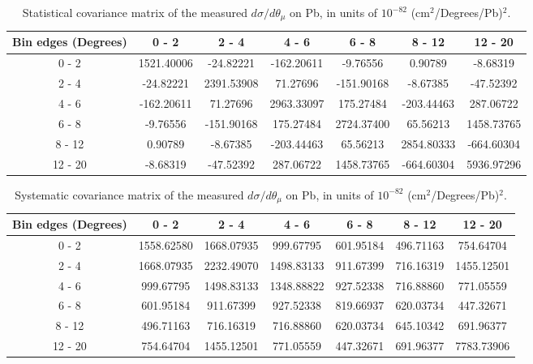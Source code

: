 \documentclass[aps,prl,twocolumn,superscriptaddress,nofootinbib]{revtex4-1}
\begin{document}
\begin{table}[h!]
  \centering
  \caption{Statistical covariance matrix of the measured $d\sigma/d\theta_{\mu}$ on Pb, in units of $10^{-82}$ (cm$^{2}$/Degrees/Pb)$^{2}$.}
    \begin{tabular}{c||cccccc}
      Bin edges (Degrees) & 0 - 2 & 2 - 4 & 4 - 6 & 6 - 8 & 8 - 12 & 12 - 20 \\
\hline \hline
        0 - 2 & 1521.40006 & -24.82221 & -162.20611 & -9.76556 &  0.90789 & -8.68319 \\
        2 - 4 & -24.82221 & 2391.53908 & 71.27696 & -151.90168 & -8.67385 & -47.52392 \\
        4 - 6 & -162.20611 & 71.27696 & 2963.33097 & 175.27484 & -203.44463 & 287.06722 \\
        6 - 8 & -9.76556 & -151.90168 & 175.27484 & 2724.37400 & 65.56213 & 1458.73765 \\
       8 - 12 &  0.90789 & -8.67385 & -203.44463 & 65.56213 & 2854.80333 & -664.60304 \\
      12 - 20 & -8.68319 & -47.52392 & 287.06722 & 1458.73765 & -664.60304 & 5936.97296 \\
    \end{tabular}
  \label{tablecov:Pb_Statistical_ThetaMu}
\end{table}

\begin{table}[h!]
  \centering
  \caption{Systematic covariance matrix of the measured $d\sigma/d\theta_{\mu}$ on Pb, in units of $10^{-82}$ (cm$^{2}$/Degrees/Pb)$^{2}$.}
    \begin{tabular}{c||cccccc}
      Bin edges (Degrees) & 0 - 2 & 2 - 4 & 4 - 6 & 6 - 8 & 8 - 12 & 12 - 20 \\
\hline \hline
        0 - 2 & 1558.62580 & 1668.07935 & 999.67795 & 601.95184 & 496.71163 & 754.64704 \\
        2 - 4 & 1668.07935 & 2232.49070 & 1498.83133 & 911.67399 & 716.16319 & 1455.12501 \\
        4 - 6 & 999.67795 & 1498.83133 & 1348.88822 & 927.52338 & 716.88860 & 771.05559 \\
        6 - 8 & 601.95184 & 911.67399 & 927.52338 & 819.66937 & 620.03734 & 447.32671 \\
       8 - 12 & 496.71163 & 716.16319 & 716.88860 & 620.03734 & 645.10342 & 691.96377 \\
      12 - 20 & 754.64704 & 1455.12501 & 771.05559 & 447.32671 & 691.96377 & 7783.73906 \\
    \end{tabular}
  \label{tablecov:Pb_Systematic_ThetaMu}
\end{table}
\end{document}
